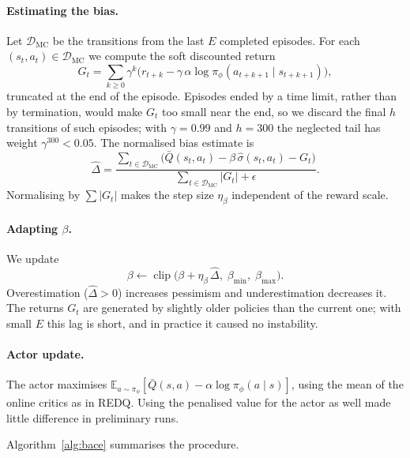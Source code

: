 \documentclass[10pt,twocolumn,letterpaper]{article}
\newcommand{\E}{\mathbb{E}}
\newcommand{\Qbar}{\bar{Q}}
\begin{document}
\paragraph{Estimating the bias.} Let $\mathcal{D}_{\text{MC}}$ be the transitions from the last $E$ completed episodes. For each $(s_t,a_t)\in\mathcal{D}_{\text{MC}}$ we compute the soft discounted return
\begin{equation}
  G_t = \sum_{k\ge0}\gamma^k\bigl(r_{t+k} - \gamma\,\alpha\log\pi_\phi(a_{t+k+1}\mid s_{t+k+1})\bigr),
\end{equation}
truncated at the end of the episode. Episodes ended by a time limit, rather than by termination, would make $G_t$ too small near the end, so we discard the final $h$ transitions of such episodes; with $\gamma=0.99$ and $h=300$ the neglected tail has weight $\gamma^{300}<0.05$. The normalised bias estimate is
\begin{equation}\label{eq:bias-estimate}
  \hat\Delta = \frac{\sum_{t\in\mathcal{D}_{\text{MC}}}\bigl(\Qbar(s_t,a_t) - \beta\,\hat\sigma(s_t,a_t) - G_t\bigr)}{\sum_{t\in\mathcal{D}_{\text{MC}}}|G_t| + \epsilon}.
\end{equation}
Normalising by $\sum|G_t|$ makes the step size $\eta_\beta$ independent of the reward scale.

\paragraph{Adapting $\beta$.} We update
\begin{equation}\label{eq:beta-update}
  \beta \leftarrow \operatorname{clip}\bigl(\beta + \eta_\beta\,\hat\Delta,\; \beta_{\min},\; \beta_{\max}\bigr).
\end{equation}
Overestimation ($\hat\Delta>0$) increases pessimism and underestimation decreases it. The returns $G_t$ are generated by slightly older policies than the current one; with small $E$ this lag is short, and in practice it caused no instability.

\paragraph{Actor update.} The actor maximises $\E_{a\sim\pi_\phi}[\Qbar(s,a) - \alpha\log\pi_\phi(a\mid s)]$, using the mean of the online critics as in REDQ. Using the penalised value for the actor as well made little difference in preliminary runs.

Algorithm~\ref{alg:bace} summarises the procedure.
\end{document}
